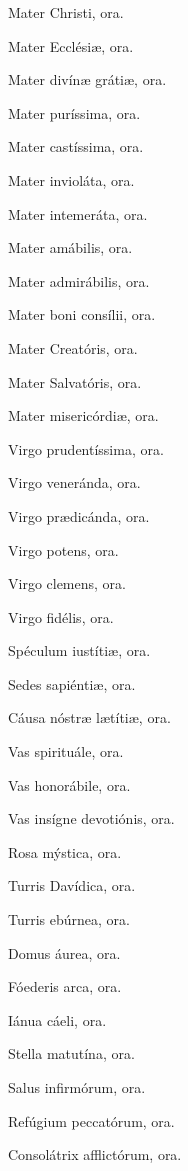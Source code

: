 \documentclass[12pt,a6paper]{book}
\begin{document}
\begin{sloppy}
\vspace{3mm}

Mater Christi, ora.

Mater Ecclésiæ, ora.

Mater divínæ grátiæ, ora.

Mater puríssima, ora.

Mater castíssima, ora.

Mater invioláta, ora.

Mater intemeráta, ora.

Mater amábilis, ora.

Mater admirábilis, ora.

Mater boni consílii, ora.

Mater Creatóris, ora.

Mater Salvatóris, ora.

Mater misericórdiæ, ora.

\vspace{3mm}

Virgo prudentíssima, ora.

Virgo veneránda, ora.

Virgo prædicánda, ora.

Virgo potens, ora.

Virgo clemens, ora.

Virgo fidélis, ora.

\vspace{3mm}

Spéculum iustítiæ, ora.

Sedes sapiéntiæ, ora.

Cáusa nóstræ lætítiæ, ora.

Vas spirituále, ora.

Vas honorábile, ora.

Vas insígne devotiónis, ora.

Rosa mýstica, ora.

Turris Davídica, ora.

Turris ebúrnea, ora.

Domus áurea, ora.

Fóederis arca, ora.

Iánua cáeli, ora.

Stella matutína, ora.

\vspace{3mm}

Salus infirmórum, ora.

Refúgium peccatórum, ora.

Consolátrix afflictórum, ora.


\end{sloppy}
\end{document}
